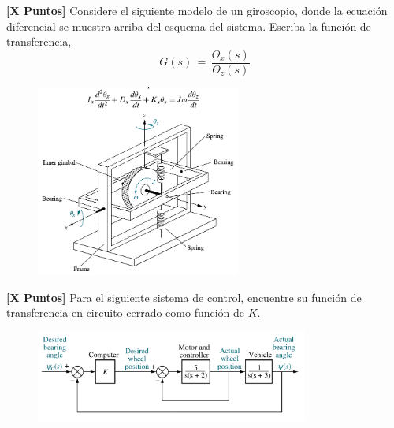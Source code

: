 \documentclass[ a4paper, twoside, 11pt]{article}
\begin{document}
\begin{problem}
\textbf{[X Puntos]} Considere el siguiente modelo de un giroscopio, donde la ecuaci\'on diferencial se muestra arriba del esquema del sistema. Escriba la funci\'on de transferencia, \iec
\[
G(s) \, = \, 
\frac{\Theta_x(s)}{\Theta_z(s)}
\]

\begin{figure}[H]
\centering
\includegraphics[width=0.6\textwidth]{figures/Nise_Prob-3-17.jpg}
\end{figure}

\end{problem}
\vspace{\baselineskip}

\begin{problem}
\textbf{[X Puntos]} Para el siguiente sistema de control, encuentre su funci\'on de transferencia en circuito cerrado como funci\'on de $K$. 

\begin{figure}[H]
\centering
\includegraphics[width=0.8\textwidth]{figures/Nise_Prob-5-51.jpg}
\end{figure}

\end{problem}
\vspace{\baselineskip}
\end{document}
